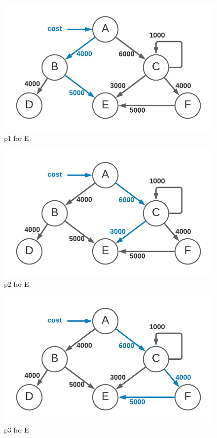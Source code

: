 \documentclass[10pt, a4paper, twocolumn]{article}
\begin{document}
      \begin{figure}[H]
        \centering
        \includegraphics[width=\linewidth]{./cost-attribution-cost-ep1.png}
        \caption{p1 for E}
        \label{figure:5}
      \end{figure}

      \begin{figure}[H]
        \centering
        \includegraphics[width=\linewidth]{./cost-attribution-cost-ep2.png}
        \caption{p2 for E}
        \label{figure:6}
      \end{figure}

      \begin{figure}[H]
        \centering
        \includegraphics[width=\linewidth]{./cost-attribution-cost-ep3.png}
        \caption{p3 for E}
        \label{figure:7}
      \end{figure}
\end{document}
